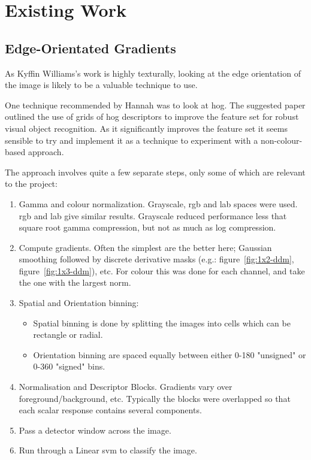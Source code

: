 \section{Existing Work}

\subsection{Edge-Orientated Gradients}\label{sec:existing-hogs}
As Kyffin Williams's work is highly texturally, looking at the edge orientation of the image is
likely to be a valuable technique to use.

One technique recommended by Hannah was to look at \gls{hog}. The suggested paper outlined the use
of grids of \gls{hog} descriptors to improve the feature set for robust visual object
recognition\cite{Dalal2005Histograms}. As it significantly improves the feature set it seems
sensible to try and implement it as a technique to experiment with a non-colour-based approach.

The approach involves quite a few separate steps, only some of which are relevant to the project:

\begin{enumerate}
\item Gamma and colour normalization. Grayscale, \gls{rgb} and \gls{lab} spaces were used.
\gls{rgb} and \gls{lab} give similar results. Grayscale reduced performance less that square root 
gamma compression, but not as much as log compression.

\item Compute gradients. Often the simplest are the better here; Gaussian smoothing followed by 
discrete derivative masks (e.g.: figure~\ref{fig:1x2-ddm}, figure~\ref{fig:1x3-ddm}), etc. For 
colour this was done for each channel, and take the one with the largest norm.

\item Spatial and Orientation binning:
\begin{itemize}
\item Spatial binning is done by splitting the images into cells which can be rectangle or radial.
\item Orientation binning are spaced equally between either 0-180 "unsigned" or 0-360 "signed" 
bins.
\end{itemize}

\item Normalisation and Descriptor Blocks. Gradients vary over foreground/background, etc. 
Typically the blocks were overlapped so that each scalar response contains several components.

\item Pass a detector window across the image.

\item Run through a Linear \gls{svm} to classify the image.
\end{enumerate}

